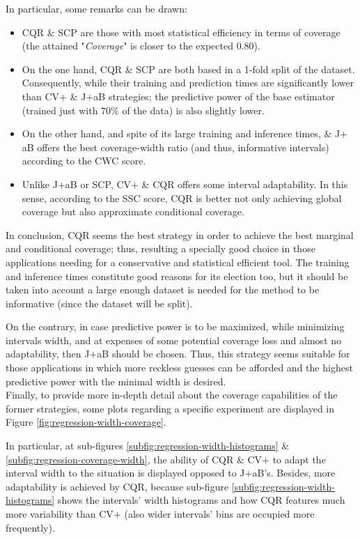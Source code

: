 In particular, some remarks can be drawn:
\begin{itemize}
    \item CQR \&  SCP are those with most statistical efficiency in terms of coverage (the attained "\textit{Coverage}" is closer to the expected $0.80$). 
    \item On the one hand, CQR \& SCP are both based in a 1-fold split of the dataset. Consequently, while their training and prediction times are significantly lower than CV$+$ \& J$+$aB strategies; the predictive power of the base estimator (trained just with $70\%$ of the data) is also slightly lower.
    \item On the other hand, and spite of its large training and inference times, \& J$+$aB offers the best coverage-width ratio (and thus, informative intervals) according to the CWC score. 
    \item Unlike J$+$aB or SCP, CV$+$ \& CQR offers some interval adaptability. In this sense, according to the SSC score, CQR is better not only achieving global coverage but also approximate conditional coverage.
\end{itemize}

In conclusion, CQR seems the best strategy in order to achieve the best marginal and conditional coverage; thus, resulting a specially good choice in those applications needing for a conservative and statistical efficient tool.
The training and inference times constitute good reasons for its election too, but it should be taken into account a large enough dataset is needed for the method to be informative (since the dataset will be split). 

On the contrary, in case predictive power is to be maximized, while minimizing intervals width, and at expenses of some potential coverage loss and almost no adaptability, then J$+$aB should be chosen. Thus, this strategy seems suitable for those applications in which more reckless guesses can be afforded and the highest predictive power with the minimal width is desired.\\

Finally, to provide more in-depth detail about the coverage capabilities of the former strategies, some plots regarding a specific experiment are displayed in Figure \ref{fig:regression-width-coverage}.

In particular, at sub-figures \ref{subfig:regression-width-histograms} \& \ref{subfig:regression-coverage-width}, the ability of CQR \& CV$+$ to adapt the interval width to the situation is displayed opposed to J$+$aB's. Besides, more adaptability is achieved by CQR, because sub-figure \ref{subfig:regression-width-histograms} shows the intervals' width histograms and how CQR features much more variability than CV$+$ (also wider intervals' bins are occupied more frequently). 

